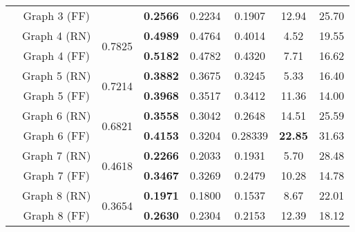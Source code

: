 \documentclass[format=acmsmall, review=false, screen=true]{acmart}
\begin{document}
\begin{table}[t]
{\begin{tabular}{|c|c|c|c|c|c|c|c|}
\multicolumn{1}{|c|}{}                              & Graph 3 (FF) &    & {\bf 0.2566}    & 0.2234 & 0.1907                                                      & 12.94                                                & 25.70 \\
\cline{2-8} 
&Graph 4 (RN)                                            & \multirow{2}{*}{0.7825} & {\bf 0.4989}    & 0.4764 & 0.4014                                                      & 4.52                                                & 19.55 \\
& Graph 4 (FF) &    & {\bf 0.5182}    & 0.4782 & 0.4320                                                      & 7.71                                                & 16.62 \\
\cline{2-8} 
&Graph 5 (RN)                                            & \multirow{2}{*}{0.7214} & {\bf 0.3882}    & 0.3675 & 0.3245                                                      & 5.33                                                & 16.40 \\
& Graph 5 (FF) &    & {\bf 0.3968}    & 0.3517 & 0.3412                                                      & 11.36                                                & 14.00 \\
\cline{2-8} 
&Graph 6 (RN)                                            & \multirow{2}{*}{0.6821} & {\bf 0.3558}    & 0.3042 & 0.2648                                                      & 14.51                                                & 25.59 \\
& Graph 6 (FF) &    & {\bf 0.4153}    & 0.3204 & 0.28339                                                      & {\bf 22.85}                                                & 31.63 \\
\cline{2-8} 
&Graph 7 (RN)                                            & \multirow{2}{*}{0.4618} & {\bf 0.2266}    & 0.2033 & 0.1931                                                      & 5.70                                                & 28.48 \\
& Graph 7 (FF) &    & {\bf 0.3467 }   & 0.3269 & 0.2479                                                      & 10.28                                                & 14.78 \\
\cline{2-8} 
&Graph 8 (RN)                                            & \multirow{2}{*}{0.3654} & {\bf 0.1971}    & 0.1800 & 0.1537                                                      & 8.67                                                & 22.01 \\
& Graph 8 (FF) &    & {\bf  0.2630}    & 0.2304 & 0.2153                                                      & 12.39                                                &18.12 \\

\end{tabular}}
\end{table}
\end{document}
